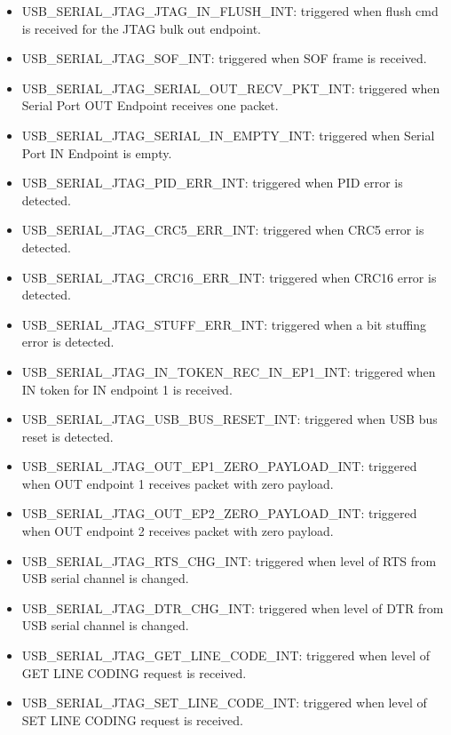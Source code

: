 \documentclass[main\_\_EN.tex]{subfiles}
\begin{document}
\begin{itemize}
\item \label{int:USBSERIALJTAGJTAGINFLUSHINT}USB\_SERIAL\_JTAG\_JTAG\_IN\_FLUSH\_INT: triggered when flush cmd is received for the JTAG bulk out endpoint.
\item \label{int:USBSERIALJTAGSOFINT}USB\_SERIAL\_JTAG\_SOF\_INT: triggered when SOF frame is received.
\item \label{int:USBSERIALJTAGSERIALOUTRECVPKTINT}USB\_SERIAL\_JTAG\_SERIAL\_OUT\_RECV\_PKT\_INT: triggered when Serial Port OUT Endpoint receives one packet.
\item \label{int:USBSERIALJTAGSERIALINEMPTYINT}USB\_SERIAL\_JTAG\_SERIAL\_IN\_EMPTY\_INT: triggered when Serial Port IN Endpoint is empty.
\item \label{int:USBSERIALJTAGPIDERRINT}USB\_SERIAL\_JTAG\_PID\_ERR\_INT: triggered when PID error is detected.
\item \label{int:USBSERIALJTAGCRC5ERRINT}USB\_SERIAL\_JTAG\_CRC5\_ERR\_INT: triggered when CRC5 error is detected.
\item \label{int:USBSERIALJTAGCRC16ERRINT}USB\_SERIAL\_JTAG\_CRC16\_ERR\_INT: triggered when CRC16 error is detected.
\item \label{int:USBSERIALJTAGSTUFFERRINT}USB\_SERIAL\_JTAG\_STUFF\_ERR\_INT: triggered when a bit stuffing error is detected.
\item \label{int:USBSERIALJTAGINTOKENRECINEP1INT}USB\_SERIAL\_JTAG\_IN\_TOKEN\_REC\_IN\_EP1\_INT: triggered when IN token for IN endpoint 1 is received.
\item \label{int:USBSERIALJTAGUSBBUSRESETINT}USB\_SERIAL\_JTAG\_USB\_BUS\_RESET\_INT: triggered when USB bus reset is detected.
\item \label{int:USBSERIALJTAGOUTEP1ZEROPAYLOADINT}USB\_SERIAL\_JTAG\_OUT\_EP1\_ZERO\_PAYLOAD\_INT: triggered when OUT endpoint 1 receives packet with zero payload.
\item \label{int:USBSERIALJTAGOUTEP2ZEROPAYLOADINT}USB\_SERIAL\_JTAG\_OUT\_EP2\_ZERO\_PAYLOAD\_INT: triggered when OUT endpoint 2 receives packet with zero payload.
\item \label{int:USBSERIALJTAGRTSCHGINT}USB\_SERIAL\_JTAG\_RTS\_CHG\_INT: triggered when level of RTS from USB serial channel is changed.
\item \label{int:USBSERIALJTAGDTRCHGINT}USB\_SERIAL\_JTAG\_DTR\_CHG\_INT: triggered when level of DTR from USB serial channel is changed.
\item \label{int:USBSERIALJTAGGETLINECODEINT}USB\_SERIAL\_JTAG\_GET\_LINE\_CODE\_INT: triggered when level of GET LINE CODING request is received.
\item \label{int:USBSERIALJTAGSETLINECODEINT}USB\_SERIAL\_JTAG\_SET\_LINE\_CODE\_INT: triggered when level of SET LINE CODING request is received.
\end{itemize}
\end{document}
